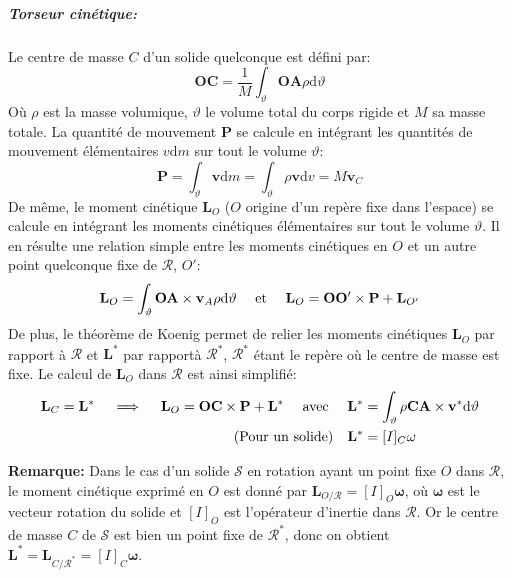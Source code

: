 \subparagraph{Torseur cinétique:}

Le centre de masse $C$ d'un solide quelconque est défini par:
\begin{equation}
\mathbf{OC} = \frac{1}{M} \int_\vartheta \! \mathbf{OA}\rho \mathrm{d} \vartheta
\end{equation}
Où $\rho$ est la masse volumique, $\vartheta$ le volume total du corps rigide et $M$ sa masse totale. La quantité de mouvement $\mathbf{P}$ se calcule en intégrant les quantités de mouvement élémentaires $v \mathrm{d}m$ sur tout le volume $\vartheta$:
\begin{equation}
\mathbf{P} = \int_\vartheta \mathbf{v} \mathrm{d}m = \int_\vartheta \rho \mathbf{v} \mathrm{d}v = M\mathbf{v}_{C}
\end{equation}
De même, le moment cinétique $\mathbf{L}_{O}$ ($O$ origine d'un repère fixe dans l'espace) se calcule en intégrant les moments cinétiques élémentaires sur tout le volume $\vartheta$. Il en résulte une relation simple entre les moments cinétiques en $O$ et un autre point quelconque fixe de $\mathcal{R}$, $O'$:
\begin{equation}\label{momentKantiSym}
\mathbf{L}_O = \int_\vartheta \mathbf{OA} \times \mathbf{v}_A \rho \mathrm{d} \vartheta \quad \textnormal{ et } \quad \mathbf{L}_O = \mathbf{OO'} \times \mathbf{P} + \mathbf{L}_{O'}
\end{equation}
De plus, le théorème de Koenig permet de relier les moments cinétiques $\mathbf{L}_O$ par rapport à $\mathcal{R}$ et $\mathbf{L}^*$ par rapportà  $\mathcal{R^*}$, $\mathcal{R^*}$ étant le repère où le centre de masse est fixe. Le calcul de $\mathbf{L}_O$ dans $\mathcal{R}$ est ainsi simplifié:
\[
\begin{alignedat}{2}
\mathbf{L}_C = \mathbf{L}^* \quad \implies \quad \mathbf{L}_O = \mathbf{OC} \times \mathbf{P} + \mathbf{L}^* \quad \textnormal{ avec } &\quad \mathbf{L}^* &&= \int_\vartheta \rho \mathbf{CA} \times \mathbf{v}^* \mathrm{d} \vartheta \\
\textnormal{(Pour un solide)} &\quad \mathbf{L}^* &&= [I]_C \mathbf{\omega}
\end{alignedat}
\]

\textbf{Remarque:} Dans le cas d'un solide $\mathcal{S}$ en rotation ayant un point fixe $O$ dans $\mathcal{R}$, le moment cinétique exprimé en $O$ est donné par 
\colorbox[gray]{0.8}{\( \mathbf{L}_{O/\mathcal{R}} = [I]_O \mathbf{\omega} \)}, 
où $\mathbf{\omega}$ est le vecteur rotation du solide et $[I]_O$ est l'opérateur d'inertie dans $\mathcal{R}$. Or le centre de masse $C$ de $\mathcal{S}$ est bien un point fixe de $\mathcal{R^*}$, donc on obtient \colorbox[gray]{0.8}{\( \mathbf{L^*} = \mathbf{L}_{C/\mathcal{R^*}} = [I]_C \mathbf{\omega} \)}.

